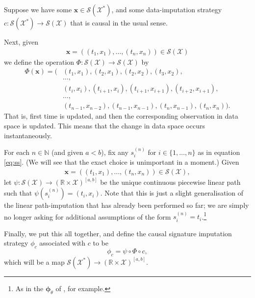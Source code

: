 \documentclass{article}
\newcommand{\reals}{\mathbb{R}}
\newcommand{\naturals}{\mathbb{N}}
\newcommand{\dataspace}{\mathcal{X}}
\newcommand{\seriesspace}{\mathcal{S}}
\begin{document}
Suppose we have some $\mathbf{x} \in \seriesspace(\dataspace^*)$, and some data-imputation strategy $c \colon \seriesspace(\dataspace^*) \to \seriesspace(\dataspace)$ that is causal in the usual sense.

Next, given
\begin{align*}
    \mathbf{x} = ((t_1, x_1), \ldots, (t_n, x_n)) \in \seriesspace(\dataspace)
\end{align*}
we define the operation $\Phi \colon \seriesspace(\dataspace) \to \seriesspace(\dataspace)$ by
\begin{align}
    \Phi(\mathbf{x}) = (&(t_1, x_1), (t_2, x_1), (t_2, x_2),(t_3, x_2),\nonumber\\
    &\ldots,\nonumber\\
    &(t_i, x_i), (t_{i + 1}, x_i), (t_{i + 1}, x_{i + 1}), (t_{i + 2}, x_{i + 1}),\nonumber\\
    &\ldots,\nonumber\\
    &(t_{n - 1}, x_{n - 2}), (t_{n - 1}, x_{n - 1}), (t_n, x_{n - 1}),(t_n, x_n)).\label{eq:causalsig}
\end{align}
That is, first time is updated, and then the corresponding observation in data space is updated. This means that the change in data space occurs instantaneously.

For each $n \in \naturals$ (and given $a < b$), fix any $s_i^{(n)}$ for $i \in \{1, \ldots, n \}$ as in equation \eqref{eq:ss}. (We will see that the exact choice is unimportant in a moment.) Given
\begin{align*}
    \mathbf{x} = ((t_1, x_1), \ldots, (t_n, x_n)) \in \seriesspace(\dataspace),
\end{align*}
let $\psi \colon \seriesspace(\dataspace) \to (\reals \times \dataspace)^{[a, b]}$ be the unique continuous piecewise linear path such that $\psi(s_i^{(n)}) = (t_i, x_i)$. Note that this is just a slight generalisation of the linear path-imputation that has already been performed so far; we are simply no longer asking for additional assumptions of the form $s_i^{(n)} = t_i$.\footnote{As in the $\mathbf{\phi}_\theta$ of \citep{toth2019gp}, for example.}

Finally, we put this all together, and define the causal signature imputation strategy $\phi_c$ associated with $c$ to be
\begin{equation*}
\phi_c = \psi \circ \Phi \circ c,
\end{equation*}
which will be a map $\seriesspace(\dataspace^*) \to (\reals \times \dataspace)^{[a, b]}$.
\end{document}
